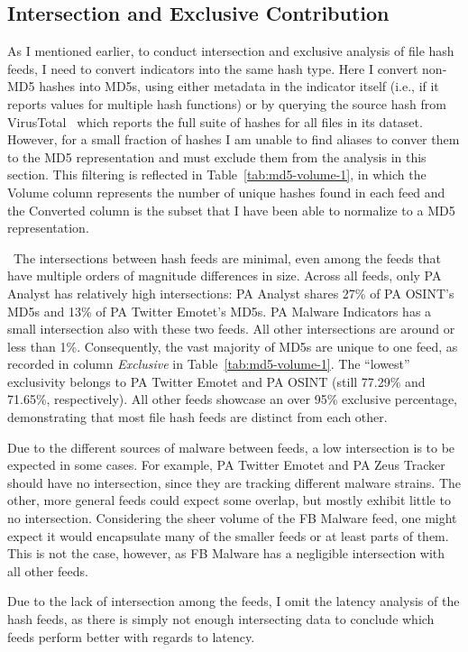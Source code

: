 \subsection{Intersection and Exclusive Contribution}
\label{sec:hash-overlap}

As I mentioned earlier, to conduct intersection and exclusive
analysis of file hash feeds, I need to convert indicators into the
same hash type. Here I convert non-MD5 hashes into MD5s, using either
metadata in the indicator itself (i.e., if it reports values for
multiple hash functions) or by querying the source hash from
VirusTotal~\cite{VirusTotal} which reports the full suite of hashes
for all files in its dataset.  However, for a small fraction of hashes
I am unable to find aliases to conver them to the MD5 representation
and must exclude them from the analysis in this section.  This filtering is
reflected in Table~\ref{tab:md5-volume-1}, in which the Volume column
represents the number of unique hashes found in each feed and the Converted
column is the subset that I have been able to normalize to a MD5
representation.

\finding\ The intersections between hash feeds are minimal,
even among the feeds that have multiple orders of magnitude differences in size.
Across all feeds, only PA Analyst has relatively high intersections: PA Analyst
shares 27\% of PA OSINT's MD5s and 13\% of PA Twitter Emotet's MD5s. PA Malware
Indicators has a small intersection also with these two feeds. All other
intersections are around or less than 1\%. Consequently, the vast majority of
MD5s are unique to one feed, as recorded in column \textit{Exclusive} in
Table~\ref{tab:md5-volume-1}. The ``lowest'' exclusivity belongs to PA Twitter
Emotet and PA OSINT (still 77.29\% and 71.65\%, respectively). All other feeds
showcase an over 95\% exclusive percentage, demonstrating that most file hash feeds
are distinct from each other.

Due to the different sources of malware between feeds, a low intersection is to
be expected in some cases. For example, PA Twitter Emotet and PA Zeus Tracker
should have no intersection, since they are tracking different malware strains.
The other, more general feeds could expect some overlap, but mostly exhibit
little to no intersection. Considering the sheer volume of the FB Malware feed,
one might expect it would encapsulate many of the smaller feeds or at least
parts of them. This is not the case, however, as FB Malware has a negligible
intersection with all other feeds.

Due to the lack of intersection among the feeds, I omit the latency analysis
of the hash feeds, as there is simply not enough intersecting data to conclude
which feeds perform better with regards to latency.
